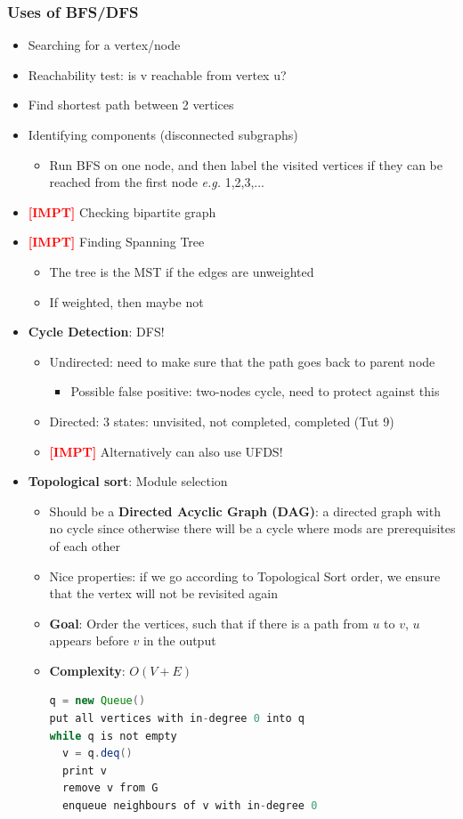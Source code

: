 \documentclass{article}
\newcommand{\eg}[0]{\textit{e.g. }}
\newcommand{\impt}[0]{\textcolor{red}{\textbf{[IMPT] }}}
\begin{document}
\begin{multicols}{2}
\subsubsection{Uses of BFS/DFS}
\begin{itemize}
	\item Searching for a vertex/node
	\item Reachability test: is v reachable from vertex u?
	\item Find shortest path between 2 vertices
	\item Identifying components (disconnected subgraphs)
	\begin{itemize}
		\item Run BFS on one node, and then label the visited vertices if they can be reached from the first node \eg 1,2,3,...
	\end{itemize}
    \item \impt Checking bipartite graph
    \item \impt Finding Spanning Tree
    \begin{itemize}
    	\item The tree is the MST if the edges are unweighted
    	\item If weighted, then maybe not
    \end{itemize}
    \item \textbf{Cycle Detection}: DFS!
    \begin{itemize}
    	\item Undirected: need to make sure that the path goes back to parent node
    	\begin{itemize}
    		\item Possible false positive: two-nodes cycle, need to protect against this
    	\end{itemize}
        \item Directed: 3 states: unvisited, not completed, completed (Tut 9)
        \item \impt Alternatively can also use UFDS!
    \end{itemize}
	\item \textbf{Topological sort}: Module selection
	\begin{itemize}
		\item Should be a \textbf{Directed Acyclic Graph (DAG)}: a directed graph with no cycle since otherwise there will be a cycle where mods are prerequisites of each other
		\item Nice properties: if we go according to Topological Sort order, we ensure that the vertex will not be revisited again
		\item \textbf{Goal}: Order the vertices, such that if there is a path from $u$ to $v$, $u$ appears before $v$ in the output
		\item \textbf{Complexity}: $O(V+E)$
		\begin{lstlisting}[language=Java]
q = new Queue()
put all vertices with in-degree 0 into q
while q is not empty
  v = q.deq()
  print v
  remove v from G
  enqueue neighbours of v with in-degree 0\end{lstlisting}
	\end{itemize}
\end{itemize}


\end{multicols}
\end{document}
